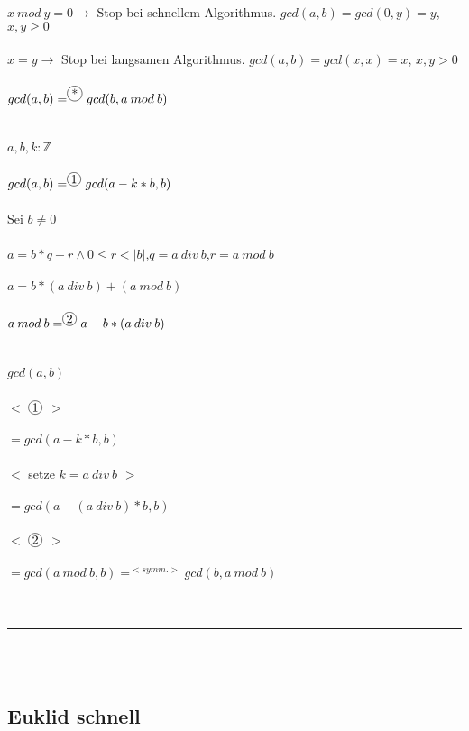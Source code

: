 \documentclass[18pt,a4paper]{article}
\newcommand*\circled[1]{\tikz[baseline=(char.base)]{
            \node[shape=circle,draw,inner sep=1pt] (char) {#1};}}
\newcommand{\tab}{\hspace*{2em}}
\begin{document}
$x \: mod \: y =0 \rightarrow$ Stop bei schnellem Algorithmus. $gcd(a,b) = gcd(0,y) = y$,\tab $x,y\geqslant0$\\
\\
$x=y \rightarrow$ Stop bei langsamen Algorithmus. $gcd(a,b) = gcd(x,x) = x$, \tab$x,y>0$\\
\\
$gcd(a,b) =^{\circled{*}} gcd(b, a\: mod\: b)$\\
\\
\\
$a,b,k : \mathbb{Z}$\\
\\
$gcd(a,b) =^{\circled{1}} gcd(a-k*b, b)$\\
\\
Sei $b\neq0$\\
\\
$a = b* q + r \wedge 0 \leqslant r < |b|$,\tab $q = a\: div \:b$,\tab $r = a\: mod\: b$\\
\\
$a = b*(a\: div \:b) + (a\: mod\: b)$\\
\\
$a\: mod\: b =^{\circled{2}} a - b*(a\: div\: b)$\\
\\
\\
$gcd(a,b)$\\
\\
\tab $<$ $\circled{1}$ $>$\\
\\
$= gcd(a-k*b,b)$\\
\\
\tab $<$ setze $k = a\: div\: b$ $>$\\
\\
$= gcd(a-(a\: div\: b)*b,b)$\\
\\
\tab $<$ $\circled{2}$ $>$\\
\\
$= gcd(a\: mod\: b, b) =^{<symm.>} gcd(b, a\: mod\: b)$\\
\\
\\
\rule{\textwidth}{0.4mm}\\
\\

\subsection{Euklid schnell}
\end{document}
